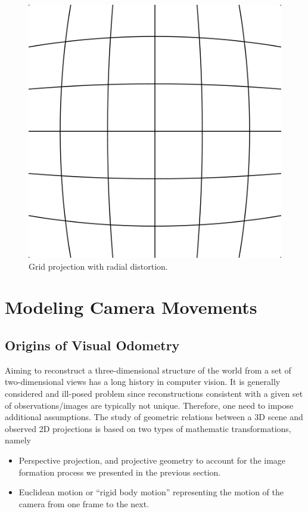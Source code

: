 \begin{figure}[h]
\centering
\includegraphics[width=0.5\columnwidth]{assets/img/barrel_distortion.png}
\caption{Grid projection with radial distortion.}%
\label{fig:radial_distortion}
\end{figure}


\section{Modeling Camera Movements}%
\label{sec:moving-scene}

\subsection{Origins of Visual Odometry}%
\label{sub:origins_of_visual_odometry}

Aiming to reconstruct a three-dimensional structure of the world from
a set of two-dimensional views has a long history in computer vision.
It is generally considered and ill-posed problem since reconstructions
consistent with a given set of observations/images are typically not unique.
Therefore, one need to impose additional assumptions.
The study of geometric relations between a 3D scene
and observed 2D projections is based on two types of mathematic transformations, namely
\begin{itemize}
	\item Perspective projection, and projective geometry to account for the image formation
		process we presented in the previous section.
	\item Euclidean motion or ``rigid body motion''
		representing the motion of the camera from one frame to the next.
\end{itemize}

